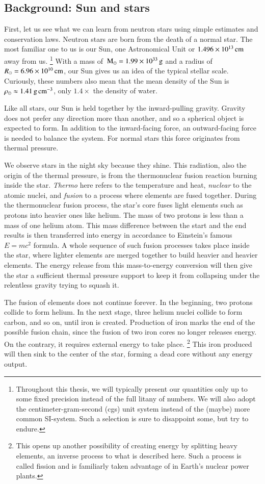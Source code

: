 \subsection{Background: Sun and stars}
First, let us see what we can learn from neutron stars using simple estimates and conservation laws.
Neutron stars are born from the death of a normal star.%
The most familiar one to us is our Sun, one Astronomical Unit or $1.496 \times 10^{13} \, \mathrm{cm}$ away from us.%
\footnote{Throughout this thesis, we will typically present our quantities only up to some fixed precision instead of the full litany of numbers.
We will also adopt the centimeter-gram-second (cgs) unit system instead of the (maybe) more common SI-system. 
Such a selection is sure to disappoint some, but try to endure.
}
With a mass of $\, \mathrm{M}_{\odot} = 1.99 \times 10^{33} \, \mathrm{g}$ and a radius of $R_{\odot} = 6.96 \times 10^{10} \, \mathrm{cm}$, our Sun gives us an idea of the typical stellar scale.
Curiously, these numbers also mean that the mean density of the Sun is $\rho_{\odot} \approx 1.41 \, \mathrm{g}\,\mathrm{cm}^{-3}$, only $1.4\times$ the density of water.

Like all stars, our Sun is held together by the inward-pulling gravity.
Gravity does not prefer any direction more than another, and so a spherical object is expected to form.
In addition to the inward-facing force, an outward-facing force is needed to balance the system.
For normal stars this force originates from thermal pressure.

We observe stars in the night sky because they shine.
This radiation, also the origin of the thermal pressure, is from the thermonuclear fusion reaction burning inside the star.
\emph{Thermo} here refers to the temperature and heat, \emph{nuclear} to the atomic nuclei, and \emph{fusion} to a process where elements are fused together.
During the thermonuclear fusion process, the star's core fuses light elements such as protons into heavier ones like helium.
The mass of two protons is less than a mass of one helium atom.
This mass difference between the start and the end results is then transferred into energy in accordance to Einstein's famous $E = mc^2$ formula.
A whole sequence of such fusion processes takes place inside the star, where lighter elements are merged together to build heavier and heavier elements.
The energy release from this mass-to-energy conversion will then give the star a sufficient thermal pressure support to keep it from collapsing under the relentless gravity trying to squash it.

The fusion of elements does not continue forever.
In the beginning, two protons collide to form helium.
In the next stage, three helium nuclei collide to form carbon, and so on, until iron is created.
Production of iron marks the end of the possible fusion chain, since the fusion of two iron cores no longer releases energy.
On the contrary, it requires external energy to take place.%
\footnote{This opens up another possibility of creating energy by splitting heavy elements, an inverse process to what is described here. Such a process is called fission and is familiarly taken advantage of in Earth's nuclear power plants.}
This iron produced will then sink to the center of the star, forming a dead core without any energy output.


